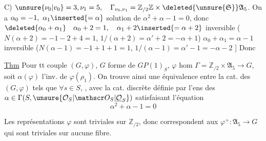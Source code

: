 C) $\unsure{\nu_0|v_0}=3,\nu_1=5,\quad\Gamma_{\nu_0,\nu_1}=\mathbb Z_{/2}\mathbb Z\times\deleted{\unsure{\mathfrak S}}\mathfrak A_5$. On a
$\alpha_0=-1,\ \alpha_1\inserted{=\alpha}$ solution de $\alpha^2+\alpha-1=0$, donc
$\deleted{\alpha_0+\alpha_1}\quad\alpha_0+2=1,\quad\alpha_1+2\inserted{=\alpha+2}$ inversible ($N(\alpha+2)=-1-2+4=1$,
$1/(\alpha+2)=\alpha'+2=-\alpha+1$) $\alpha_0+\alpha_1=\alpha-1$ inversible
($N(\alpha-1)=-1+1+1=1$, $1/(\alpha-1)=\alpha'-1=-\alpha-2$ ] Donc

\uline{Thm} Pour tt  couple $(G,\varphi)$, $G$ forme de
$GP(1)_S$, $\varphi$ hom $\Gamma=\mathbb Z_{/2}\times\mathfrak A_5\longrightarrow G$, soit
$\alpha(\varphi)$ l'inv. de $\varphi(\rho_1)$. On trouve ainsi une
équivalence entre la cat. des $(G,\varphi)$
tels que $\forall s\in S$, ,
avec la  cat. discrète 
définie par l'ens des $\alpha\in\Gamma(S,\unsure{\mathcal O_S|\mathscr O_S|\underline{\mathcal O}_S})$ satisfaisant
l'équation
\[\alpha^2+\alpha-1=0\]

Les représentations $\varphi$ sont triviales sur $\mathbb Z_{/2}$,
donc correspondent  aux
$\varphi^+:\mathfrak A_5\longrightarrow G$ qui sont triviales sur
aucune fibre.
